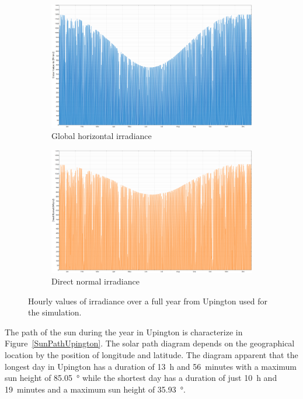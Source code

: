 \begin{figure}[!htbp]
        \centering
                \begin{subfigure}[b]{1\textwidth}
                \centering
                \includegraphics[width=1\textwidth]{FIG/Upington_GHI}
                \caption{Global horizontal irradiance}\label{Upington_GHI}
        \end{subfigure}%
\par\medskip %
        \begin{subfigure}[b]{1\textwidth}
                \centering
                \includegraphics[width=1\textwidth]{FIG/Upington_DNI}
                \caption{Direct normal irradiance}\label{Upington_DNI}
        \end{subfigure}%

        \caption[Hourly values of irradiance over a full year from Upington used for the simulation.]{Hourly values of irradiance over a full year from Upington used for the simulation.}\label{Upington_GHI/DNI}
\end{figure}
The path of the sun during the year in Upington is characterize in Figure~\ref{SunPathUpington}. The solar path diagram depends on the geographical location by the position of longitude and latitude. The diagram apparent that the longest day in Upington has a duration of \SI{13}{h} and \SI{56}{minutes} with a maximum sun height of \SI{85.05}{\degree} while the shortest day has a duration of just \SI{10}{h} and \SI{19}{minutes} and a maximum sun height of \SI{35.93}{\degree}.

